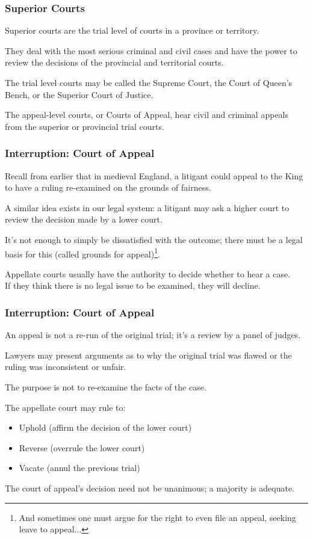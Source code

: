\begin{frame}
\frametitle{Superior Courts}

Superior courts are the trial level of courts in a province or territory. 

They deal with the most serious criminal and civil cases and have the power to review the decisions of the provincial and territorial courts.

The trial level courts may be called the Supreme Court, the Court of Queen's Bench, or the Superior Court of Justice.

The appeal-level courts, or Courts of Appeal, hear civil and criminal appeals from the superior or provincial trial courts.

\end{frame}




\begin{frame}
\frametitle{Interruption: Court of Appeal}

Recall from earlier that in medieval England, a litigant could appeal to the King to have a ruling re-examined on the grounds of fairness. 

A similar idea exists in our legal system: a litigant may ask a higher court to review the decision made by a lower court.

It's not enough to simply be dissatisfied with the outcome; there must be a legal basis for this (called \alert{grounds for appeal})\footnote{And sometimes one must argue for the right to even file an appeal, seeking leave to appeal...}.

Appellate courts usually have the authority to decide whether to hear a case.\\
\quad If they think there is no legal issue to be examined, they will decline.

\end{frame}



\begin{frame}
\frametitle{Interruption: Court of Appeal}

An appeal is not a re-run of the original trial; it's a review by a panel of judges.

Lawyers may present arguments as to why the original trial was flawed or the ruling was inconsistent or unfair.

The purpose is not to re-examine the facts of the case.

The appellate court may rule to:

\begin{itemize}
	\item Uphold (affirm the decision of the lower court)
	\item Reverse (overrule the lower court)
	\item Vacate (annul the previous trial)
\end{itemize}

The court of appeal's decision need not be unanimous; a majority is adequate.

\end{frame}



